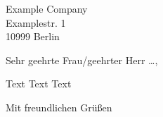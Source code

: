 \documentclass[
  letter,
  paper=a4,
  version=last,
  fontsize=11pt,
  DIV=13,
  BCOR=0mm,
  parskip=full,
]{scrlttr2}
\begin{document}

\begin{letter}{
  Example Company \\
  Examplestr. 1 \\
  10999 Berlin
}

\opening{Sehr geehrte Frau/geehrter Herr …,}

Text Text Text

\closing{Mit freundlichen Grüßen}


\end{letter}
\end{document}
